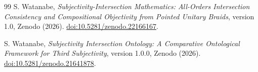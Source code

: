 \documentclass[11pt]{article}
\theoremstyle{definition}
\theoremstyle{remark}
\begin{document}
\begin{thebibliography}{99}
S. Watanabe, \emph{Subjectivity-Intersection Mathematics: All-Orders Intersection Consistency and Compositional Objectivity from Pointed Unitary Braids}, version 1.0, Zenodo (2026). \href{https://doi.org/10.5281/zenodo.22166167}{doi:10.5281/zenodo.22166167}.

S. Watanabe, \emph{Subjectivity Intersection Ontology: A Comparative Ontological Framework for Third Subjectivity}, version 1.0.0, Zenodo (2026). \href{https://doi.org/10.5281/zenodo.21641878}{doi:10.5281/zenodo.21641878}.

\end{thebibliography}
\end{document}
